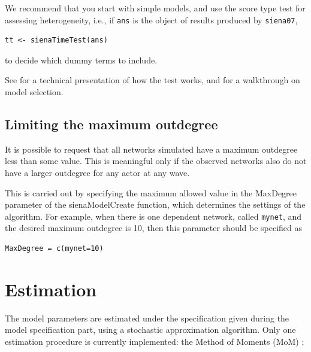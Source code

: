 \documentclass[a4paper,fleqn]{article}
\newcommand{\+}{\, + \,}
\begin{document}
{We recommend that you start with simple models, and use the score type test for
assessing heterogeneity, i.e., if \texttt{ans} is the object of results produced
by \texttt{siena07},
\begin{verbatim}
tt <- sienaTimeTest(ans)
\end{verbatim}
to decide which dummy terms to include.

See \citet{Lospinoso2010a} for a technical presentation of how the test works,
and \citet{Lospinoso2010b} for a walkthrough on model selection.

\subsection{Limiting the maximum outdegree}
\label{S_maxdegree}

It is possible to request that all networks simulated have a
maximum outdegree less than some value.
This is meaningful only if the observed networks also do
not have a larger outdegree for any actor at any wave.

This is carried out by specifying the maximum allowed value
in the \textsf{MaxDegree} parameter of the \textsf{sienaModelCreate}
function, which determines the settings of the algorithm.
For example, when there is one dependent network, called \texttt{mynet},
and the desired maximum outdegree is 10, then this parameter
should be specified as
\begin{verbatim}
MaxDegree = c(mynet=10)
\end{verbatim}

\begin{print}
\newpage
\end{print}

\section{Estimation}
\label{S_Est}

The model parameters are estimated under the specification given
during the model specification part, using a stochastic
approximation algorithm.
Only one estimation procedure is currently implemented:
the Method of Moments (MoM) \citep*{Snijders01, SnijdersEA07};


}
\end{document}
